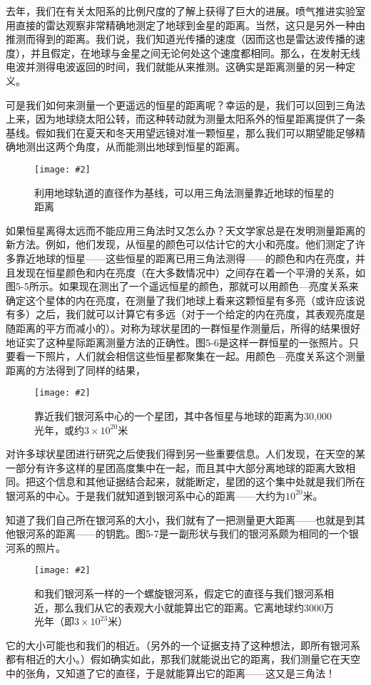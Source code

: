\documentclass[12pt,oneside]{book}
\newenvironment{fig}[2][1]
{\begin{figure}[H]
\centering
\texttt{[image: \#2]}}
{\end{figure}}
\begin{document}
去年，我们在有关太阳系的比例尺度的了解上获得了巨大的进展。喷气推进实验室用直接的雷达观察非常精确地测定了地球到金星的距离。当然，这只是另外一种由推测而得到的距离。我们说，我们知道光传播的速度（因而这也是雷达波传播的速度），并且假定，在地球与金星之间无论何处这个速度都相同。那么，在发射无线电波并测得电波返回的时间，我们就能从来推测。这确实是距离测量的另一种定义。

可是我们如何来测量一个更遥远的恒星的距离呢？幸运的是，我们可以回到三角法上来，因为地球绕太阳公转，而这种转动就为测量太阳系外的恒星距离提供了一条基线。假如我们在夏天和冬天用望远镜对准一颗恒星，那么我们可以期望能足够精确地测出这两个角度，从而能测出地球到恒星的距离。
\begin{fig}{三角法测量恒星距离}
\caption{\footnotesize 利用地球轨道的直径作为基线，可以用三角法测量靠近地球的恒星的距离}
\label{fig:三角法测量恒星距离}
\end{fig}

如果恒星离得太远而不能应用三角法时又怎么办？天文学家总是在发明测量距离的新方法。例如，他们发现，从恒星的颜色可以估计它的大小和亮度。他们测定了许多靠近地球的恒星——这些恒星的距离已用三角法测得——的颜色和内在亮度，并且发现在恒星颜色和内在亮度（在大多数情况中）之间存在着一个平滑的关系，如图5-5所示。如果现在测出了一个遥远恒星的颜色，那就可以用颜色—亮度关系来确定这个星体的内在亮度，在测量了我们地球上看来这颗恒星有多亮（或许应该说有多）之后，我们就可以计算它有多远（对于一个给定的内在亮度，其表观亮度是随距离的平方而减小的）。对称为球状星团的一群恒星作测量后，所得的结果很好地证实了这种星际距离测量方法的正确性。图5-6是这样一群恒星的一张照片。只要看一下照片，人们就会相信这些恒星都聚集在一起。用颜色—亮度关系这个测量距离的方法得到了同样的结果，
\begin{fig}[2.5]{靠近我们银河系中心的一个星团}
\caption{\footnotesize 靠近我们银河系中心的一个星团，其中各恒星与地球的距离为30,000光年，或约$ 3\times 10^{20} $米}
\label{fig:靠近我们银河系中心的一个星团}
\end{fig}

对许多球状星团进行研究之后使我们得到另一些重要信息。人们发现，在天空的某一部分有许多这样的星团高度集中在一起，而且其中大部分离地球的距离大致相同。把这个信息和其他证据结合起来，就能断定，星团的这个集中处就是我们所在银河系的中心。于是我们就知道到银河系中心的距离——大约为$ 10^{20} $米。

知道了我们自己所在银河系的大小，我们就有了一把测量更大距离——也就是到其他银河系的距离——的钥匙。图5-7是一副形状与我们的银河系颇为相同的一个银河系的照片。
\begin{fig}[2.5]{和我们银河系一样的一个螺旋银河系}
\caption{\footnotesize 和我们银河系一样的一个螺旋银河系，假定它的直径与我们银河系相近，那么我们从它的表观大小就能算出它的距离。它离地球约3000万光年（即$ 3\times 10^{23} $米）}
\label{fig:和我们银河系一样的一个螺旋银河系}
\end{fig}
它的大小可能也和我们的相近。（另外的一个证据支持了这种想法，即所有银河系都有相近的大小。）假如确实如此，那我们就能说出它的距离，我们测量它在天空中的张角，又知道了它的直径，于是就能算出它的距离——这又是三角法！
\end{document}
